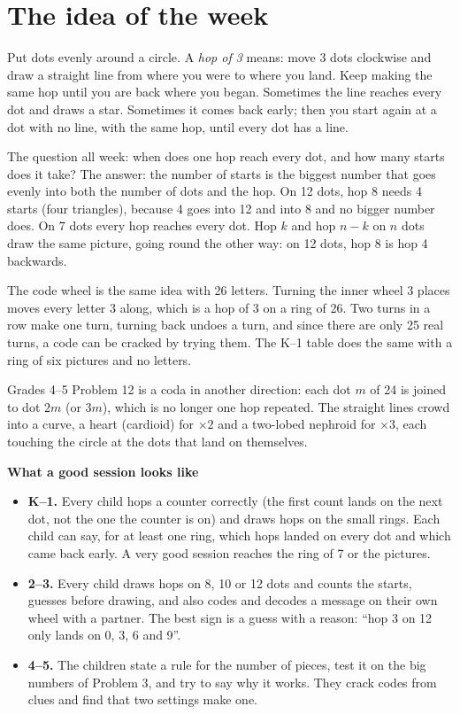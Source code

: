 \documentclass[11pt]{article}
\begin{document}
\section{The idea of the week}

Put dots evenly around a circle. A \emph{hop of 3} means: move 3 dots clockwise and draw a straight line from
where you were to where you land. Keep making the same hop until you are back where you began. Sometimes the line
reaches every dot and draws a star. Sometimes it comes back early; then you start again at a dot with no line,
with the same hop, until every dot has a line.

The question all week: when does one hop reach every dot, and how many starts does it take? The answer: the
number of starts is the biggest number that goes evenly into both the number of dots and the hop. On 12 dots,
hop 8 needs 4 starts (four triangles), because 4 goes into 12 and into 8 and no bigger number does. On 7 dots
every hop reaches every dot. Hop $k$ and hop $n-k$ on $n$ dots draw the same picture, going round the other way:
on 12 dots, hop 8 is hop 4 backwards.

The code wheel is the same idea with 26 letters. Turning the inner wheel 3 places moves every letter 3 along,
which is a hop of 3 on a ring of 26. Two turns in a row make one turn, turning back undoes a turn, and since
there are only 25 real turns, a code can be cracked by trying them. The K--1 table does the same with a ring of
six pictures and no letters.

Grades 4--5 Problem 12 is a coda in another direction: each dot $m$ of 24 is joined to dot $2m$ (or $3m$), which
is no longer one hop repeated. The straight lines crowd into a curve, a heart (cardioid) for $\times2$ and a
two-lobed nephroid for $\times3$, each touching the circle at the dots that land on themselves.

\textbf{What a good session looks like}
\begin{itemize}
\item \textbf{K--1.} Every child hops a counter correctly (the first count lands on the next dot, not the one
  the counter is on) and draws hops on the small rings. Each child can say, for at least one ring, which hops
  landed on every dot and which came back early. A very good session reaches the ring of 7 or the pictures.
\item \textbf{2--3.} Every child draws hops on 8, 10 or 12 dots and counts the starts, guesses before drawing,
  and also codes and decodes a message on their own wheel with a partner. The best sign is a guess with a reason:
  ``hop 3 on 12 only lands on 0, 3, 6 and 9''.
\item \textbf{4--5.} The children state a rule for the number of pieces, test it on the big numbers of
  Problem 3, and try to say why it works. They crack codes from clues and find that two settings make one.
\end{itemize}
\end{document}

